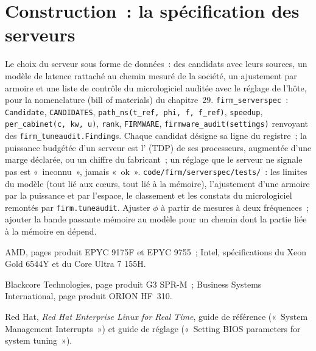 \label{lst:nw:servers:model}

\section{Construction~: la spécification des serveurs}\label{bld:nw:servers:serverspec}

\begin{build}
 Le choix du serveur sous forme de données~: des candidats avec leurs sources, un modèle de latence rattaché au chemin mesuré de la société, un ajustement par armoire et une liste de contrôle du micrologiciel
auditée avec le réglage de l'hôte, pour la nomenclature (bill of materials) du chapitre~29.
 \texttt{firm\_serverspec}~: \texttt{Candidate}, \texttt{CANDIDATES}, \texttt{path\_ns(t\_ref, phi, f, f\_ref)},
\texttt{speedup}, \texttt{per\_cabinet(c, kw, u)}, \texttt{rank}, \texttt{FIRMWARE}, \texttt{firmware\_audit(settings)} renvoyant des
\texttt{firm\_tuneaudit.Finding}s.
 Chaque candidat désigne sa ligne du registre~; la puissance budgétée d'un serveur est l' (TDP) de ses processeurs, augmentée d'une marge déclarée,
ou un chiffre du fabricant~; un réglage que le serveur ne signale pas est «~inconnu~», jamais «~ok~».
 \texttt{code/firm/serverspec/tests/}~: les limites du modèle (tout lié aux cœurs, tout lié à la mémoire), l'ajustement d'une armoire par la puissance
et par l'espace, le classement et les constats du micrologiciel remontés par \texttt{firm.tuneaudit}.
 Ajuster $\phi$ à partir de mesures à deux fréquences~; ajouter la bande passante mémoire au modèle pour un chemin dont la partie liée à la mémoire en dépend.
\end{build}

\begin{omsources}
\item AMD, pages produit EPYC 9175F et EPYC 9755~; Intel, spécifications du Xeon Gold 6544Y et du Core Ultra 7 155H.
\item Blackcore Technologies, page produit G3 SPR-M~; Business Systems International, page produit ORION HF~310.
\item Red Hat, \emph{Red Hat Enterprise Linux for Real Time}, guide de référence («~System Management Interrupts~») et guide de réglage («~Setting
BIOS parameters for system tuning~»).
\end{omsources}

